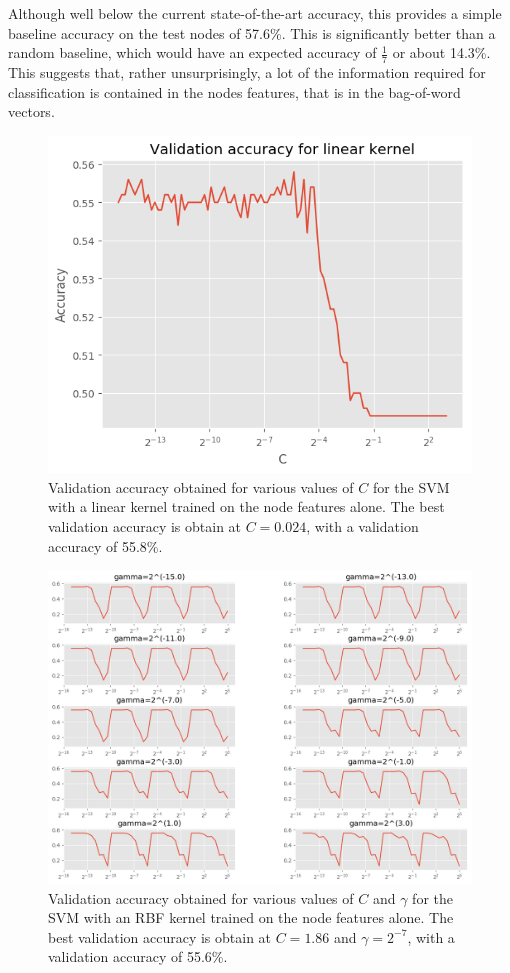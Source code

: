 \documentclass[12pt]{article}
\theoremstyle{definition}
\begin{document}
Although well below the current state-of-the-art accuracy, this provides a simple baseline accuracy on the test nodes of 57.6\%. This is significantly better than a random baseline, which would have an expected accuracy of $\frac{1}{7}$ or about 14.3\%. This suggests that, rather unsurprisingly, a lot of the information required for classification is contained in the nodes features, that is in the bag-of-word vectors. 

\begin{figure}[h]
	\includegraphics[width=1.0\textwidth]{node_svm/linear_reg}
	\centering
	\caption{Validation accuracy obtained for various values of $C$ for the SVM with a linear kernel trained on the node features alone. The best validation accuracy is obtain at $C=0.024$, with a validation accuracy of 55.8\%.}
	\label{fig/node_svm_linear_reg}
\end{figure}
\begin{figure}[h]
	\includegraphics[width=1.0\textwidth]{node_svm/rbf_reg}
	\centering
	\caption{Validation accuracy obtained for various values of $C$ and $\gamma$ for the SVM with an RBF kernel trained on the node features alone. The best validation accuracy is obtain at $C=1.86$ and $\gamma=2^{-7}$, with a validation accuracy of 55.6\%.}
	\label{fig/node_svm_rbf_reg}
\end{figure}
\end{document}
